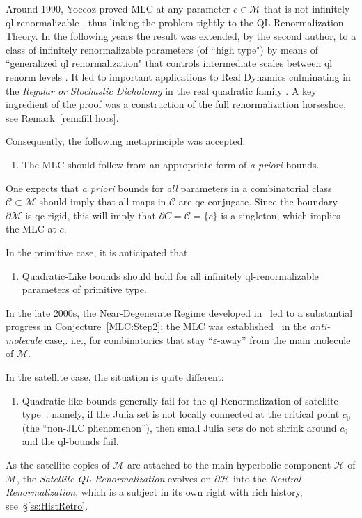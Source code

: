 \documentclass{amsart}
\newcommand{\1}{{\mathbb 1 }}
\newcommand{\Mandel}{{\mathcal{M}}}
\newcommand\MM{\mathcal{M}}
\newcommand\HH{\mathcal{H}}
\theoremstyle{remark}
\numberwithin{equation}{section}
\theoremstyle{definition}
\begin{document}
Around 1990, Yoccoz proved MLC at any parameter $c\in \Mandel$ that is
not infinitely ql renormalizable \cite{Hub:Yoccoz, Mil},
thus linking the problem tightly to the QL Renormalization Theory. 
In the following years the result was extended, by the second author, to a class of infinitely renormalizable parameters (of ``high type")  by means of ``generalized ql renormalization" that controls intermediate scales between ql renorm levels \cite{L-acta}.
It led to important applications to Real Dynamics culminating in the \emph{Regular or Stochastic Dichotomy} in the real quadratic family \cite{L-aster,L-regul vs stoch}. A key ingredient of the proof was a construction of the full renormalization horseshoe, see Remark~\ref{rem:fill hors}.



Consequently, the following metaprinciple was accepted:
\begin{enumerate}[label=\text{(\Roman*)},font=\normalfont,leftmargin=*]
\item\label{MLC:Step1} The MLC should follow from an appropriate form of \emph{a priori} bounds.
\end{enumerate}
One expects that \emph{a priori} bounds for \emph{all} parameters in a combinatorial class $\mathcal C\subset \mathcal M$ should imply that all maps in $\mathcal C$ are qc conjugate. Since the boundary $\partial \MM$ is qc rigid, this will imply that $\partial C=\mathcal C=\{c\}$ is a singleton, which implies the MLC at $c$.

In the primitive case, it is anticipated that
\begin{enumerate}[label=\text{(\Roman*)},font=\normalfont,leftmargin=*,start=2]
\item \label{MLC:Step2} Quadratic-Like bounds should hold for all infinitely ql-renormalizable parameters of primitive type.
\end{enumerate}
In the late 2000s, the Near-Degenerate Regime developed in~\cite{K, KL, KL2, molecules} led to a substantial progress in Conjecture~\ref{MLC:Step2}: the MLC was established \
in the {\em anti-molecule} case,. i.e.,
for combinatorics that stay ``$\varepsilon$-away'' from the main molecule of $\Mandel$.





In the satellite case, the situation is quite different:
\begin{enumerate}[label=\text{(\Roman*)},font=\normalfont,leftmargin=*,start=3]
\item \label{MLC:Step3} Quadratic-like bounds generally fail for the ql-Renormalization of satellite type~\cite[\S2]{Mil}: namely, if the Julia set is not locally connected at the critical point $c_0$ (the ``non-JLC phenomenon''), then small Julia sets do not shrink around $c_0$ and the ql-bounds fail.
\end{enumerate}
As the satellite copies of $\Mandel$ are attached to the main hyperbolic component $\HH$ of $\Mandel$, the {\em Satellite QL-Renormalization} evolves on $\partial \HH$ into the {\em Neutral Renormalization}, which is a subject in its own right with rich history, see~\S\ref{ss:HistRetro}. 
\end{document}
